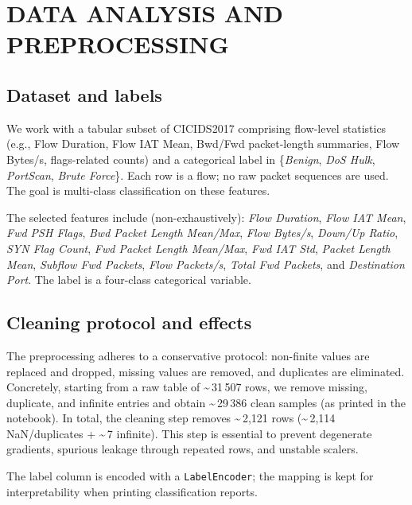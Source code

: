 
\section{DATA ANALYSIS AND PREPROCESSING} \label{sec:data-analysis-preprocessing}

    \subsection{Dataset and labels}
    
        We work with a tabular subset of CICIDS2017 comprising flow-level statistics (e.g., Flow Duration, Flow IAT Mean, Bwd/Fwd packet-length summaries, Flow Bytes/s, flags-related counts) and a categorical label in \{\emph{Benign}, \emph{DoS Hulk}, \emph{PortScan}, \emph{Brute Force}\}. 
        Each row is a flow; no raw packet sequences are used. The goal is multi-class classification on these features.

        The selected features include (non-exhaustively): \textit{Flow Duration}, \textit{Flow IAT Mean}, \textit{Fwd PSH Flags}, \textit{Bwd Packet Length Mean/Max}, \textit{Flow Bytes/s}, \textit{Down/Up Ratio}, \textit{SYN Flag Count}, \textit{Fwd Packet Length Mean/Max}, \textit{Fwd IAT Std}, \textit{Packet Length Mean}, \textit{Subflow Fwd Packets}, \textit{Flow Packets/s}, \textit{Total Fwd Packets}, and \textit{Destination Port}. 
        The label is a four-class categorical variable.

    \subsection{Cleaning protocol and effects}

        The preprocessing adheres to a conservative protocol: non-finite values are replaced and dropped, missing values are removed, and duplicates are eliminated. Concretely, starting from a raw table of \textasciitilde\,31\,507 rows, we remove missing, duplicate, and infinite entries and obtain \textasciitilde\,29\,386 clean samples (as printed in the notebook). 
        In total, the cleaning step removes \textasciitilde\,2,121 rows (\textasciitilde\,2,114 NaN/duplicates + \textasciitilde\,7 infinite). 
        This step is essential to prevent degenerate gradients, spurious leakage through repeated rows, and unstable scalers.

        The label column is encoded with a \texttt{LabelEncoder}; the mapping is kept for interpretability when printing classification reports.

